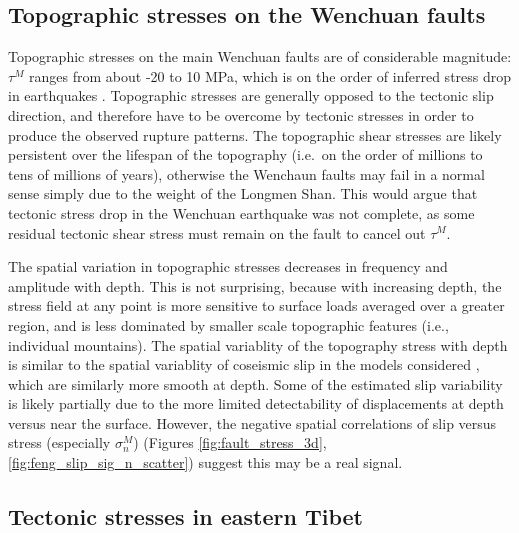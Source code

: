 \documentclass[twocolumn,jgrga]{AGUTeX}
\begin{document}
\begin{article}
\subsection{Topographic stresses on the Wenchuan
faults}\label{topographic-stresses-on-the-wenchuan-faults}

Topographic stresses on the main Wenchuan faults are of considerable
magnitude: $\tau^M$ ranges from about -20 to 10 MPa, which is on the
order of inferred stress drop in earthquakes \citep[e.g.,][]{kanamori1975,
allmann2009}. Topographic stresses are
generally opposed to the tectonic slip direction, and therefore have to
be overcome by tectonic stresses in order to produce the observed
rupture patterns. The topographic shear stresses are likely persistent
over the lifespan of the topography (i.e.~on the order of millions to
tens of millions of years), otherwise the Wenchaun faults may fail in a
normal sense simply due to the weight of the Longmen Shan. This would
argue that tectonic stress drop in the Wenchuan earthquake was not
complete, as some residual tectonic shear stress must remain on the
fault to cancel out $\tau^M$.

The spatial variation in topographic stresses decreases in frequency and
amplitude with depth. This is not surprising, because with increasing
depth, the stress field at any point is more sensitive to surface loads
averaged over a greater region, and is less dominated by smaller scale
topographic features (i.e., individual mountains). The spatial
variablity of the topography stress with depth is similar to the spatial
variablity of coseismic slip in the models considered \citep[e.g.,][]
{zhang2011}, which are similarly more smooth at depth. Some of the
estimated slip variability is likely partially due to the more limited
detectability of displacements at depth versus near the surface.
However, the negative spatial correlations of slip versus stress
(especially $\sigma^M_n$) (Figures \ref{fig:fault_stress_3d},
\ref{fig:feng_slip_sig_n_scatter}) suggest this may be a real signal.

\subsection{Tectonic stresses in eastern
Tibet}\label{tectonic-stresses-in-eastern-tibet}


\end{article}
\end{document}
